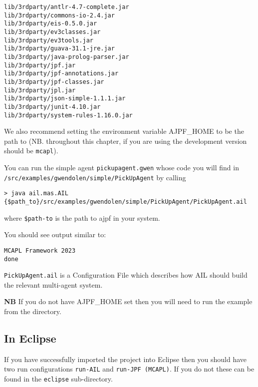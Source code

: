\begin{verbatim}
lib/3rdparty/antlr-4.7-complete.jar
lib/3rdparty/commons-io-2.4.jar
lib/3rdparty/eis-0.5.0.jar
lib/3rdparty/ev3classes.jar
lib/3rdparty/ev3tools.jar
lib/3rdparty/guava-31.1-jre.jar
lib/3rdparty/java-prolog-parser.jar
lib/3rdparty/jpf.jar
lib/3rdparty/jpf-annotations.jar
lib/3rdparty/jpf-classes.jar
lib/3rdparty/jpl.jar
lib/3rdparty/json-simple-1.1.1.jar
lib/3rdparty/junit-4.10.jar
lib/3rdparty/system-rules-1.16.0.jar
\end{verbatim}

We also recommend setting the environment variable AJPF\_HOME to be the path to \texttt{\ajpfversion} (NB. throughout this chapter, if you are using the development version \texttt{\ajpfversion} should be \texttt{mcapl}).

You can run the simple agent \texttt{pickupagent.gwen} whose code you will find in \texttt{/src/examples/gwendolen/simple/PickUpAgent} by calling

\noindent \begin{lstlisting}[basicstyle=\tiny]
> java ail.mas.AIL {$path_to}/src/examples/gwendolen/simple/PickUpAgent/PickUpAgent.ail
\end{lstlisting}
\medskip

\noindent where \texttt{\${path-to}} is the path to ajpf in your system.

You should see output similar to:

\noindent \begin{lstlisting}
MCAPL Framework 2023
done
\end{lstlisting}
\medskip
 
\texttt{PickUpAgent.ail} is a Configuration File which describes how AIL should build the relevant multi-agent system.

{\bf NB}  If you do not have AJPF\_HOME set then you will need to run the example from the \texttt{\ajpfversion} directory.

\subsection{In Eclipse}

If you have successfully imported the project into Eclipse then you should have two run configurations \texttt{run-AIL} and \texttt{run-JPF (MCAPL)}.  If you do not these can be found in the \texttt{eclipse} sub-directory.

